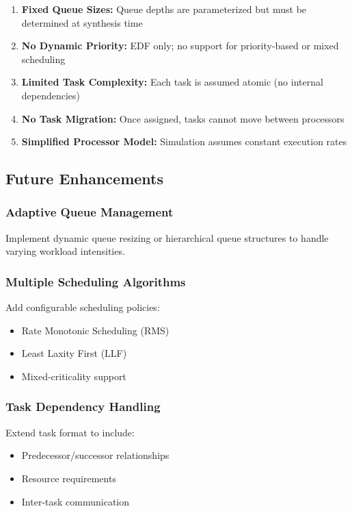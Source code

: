\documentclass[12pt,a4paper]{article}
\begin{document}
\begin{enumerate}
    \item \textbf{Fixed Queue Sizes:} Queue depths are parameterized but must be determined at synthesis time
    \item \textbf{No Dynamic Priority:} EDF only; no support for priority-based or mixed scheduling
    \item \textbf{Limited Task Complexity:} Each task is assumed atomic (no internal dependencies)
    \item \textbf{No Task Migration:} Once assigned, tasks cannot move between processors
    \item \textbf{Simplified Processor Model:} Simulation assumes constant execution rates
\end{enumerate}

\subsection{Future Enhancements}

\subsubsection{Adaptive Queue Management}
Implement dynamic queue resizing or hierarchical queue structures to handle varying workload intensities.

\subsubsection{Multiple Scheduling Algorithms}
Add configurable scheduling policies:
\begin{itemize}
    \item Rate Monotonic Scheduling (RMS)
    \item Least Laxity First (LLF)
    \item Mixed-criticality support
\end{itemize}

\subsubsection{Task Dependency Handling}
Extend task format to include:
\begin{itemize}
    \item Predecessor/successor relationships
    \item Resource requirements
    \item Inter-task communication
\end{itemize}
\end{document}
